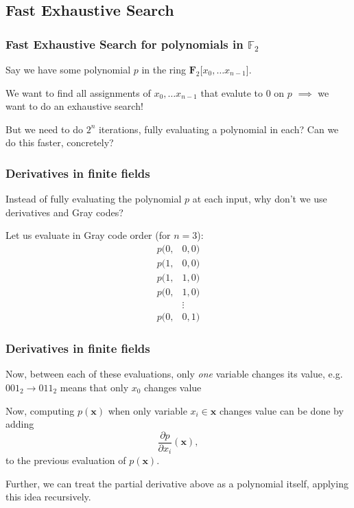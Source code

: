 \documentclass{beamer}
\begin{document}
\subsection{Fast Exhaustive Search}
\begin{frame}
    \frametitle{Fast Exhaustive Search for polynomials in $\mathbb{F}_2$}
    Say we have some polynomial $p$ in the ring $\mathbf{F}_2[x_0,\dots x_{n-1}$].
    
    \pause

    We want to find all assignments of $x_0, \dots x_{n - 1}$ that evalute to 0 on $p$ $\implies$ we want to do an exhaustive search!

    But we need to do $2^n$ iterations, fully evaluating a polynomial in each? Can we do this faster, concretely?
\end{frame}

\begin{frame}
    \frametitle{Derivatives in finite fields}
    Instead of fully evaluating the polynomial $p$ at each input, why don't we use derivatives and Gray codes? 
    
    \pause 

    Let us evaluate in Gray code order (for $n = 3$):
    \begin{equation*}
        \begin{split}
            p(0,&0,0)\\
            p(1,&0,0)\\
            p(1,&1,0)\\
            p(0,&1,0)\\
            &\vdots\\
            p(0,&0,1)
        \end{split}
    \end{equation*}
\end{frame}

\begin{frame}
    \frametitle{Derivatives in finite fields}
    Now, between each of these evaluations, only \textit{one} variable changes its value, e.g. $001_2 \rightarrow 011_2$ means that only $x_0$ changes value

    \pause

    Now, computing $p(\mathbf{x})$ when only variable $x_i \in \mathbf{x}$ changes value can be done by adding 
    $$
        \frac{\partial p}{\partial x_i}(\mathbf{x}),
    $$
    to the previous evaluation of $p(\mathbf{x})$. 

    \pause
    
    Further, we can treat the partial derivative above as a polynomial itself, applying this idea recursively.
\end{frame}
\end{document}
